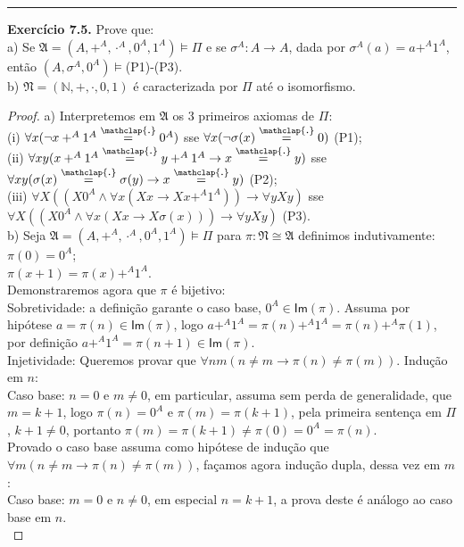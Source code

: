 \documentclass[11pt]{article}
\newcommand{\mf}[1]{\mathfrak{#1}}
\newcommand{\msf}[1]{\mathsf{#1}}
\newcommand{\mbb}[1]{\mathbb{#1}}
\newcommand\overtext[2]{\stackrel{\mathclap{\normalfont\mbox{#1}}}{#2}}
\begin{document}
\hrule

\begin{shaded}
\textbf{Exercício 7.5.} Prove que:\\
a) Se $\mf{A}=(A,+^A,\cdot^A,0^A,1^A)\vDash\Pi$ e se $\sigma^A:A\to A$, dada por $\sigma^A(a)=a+^A1^A$, então $(A,\sigma^A,0^A)\vDash$(P1)-(P3).\\
b) $\mf{N}=(\mbb{N},+,\cdot,0,1)$ é caracterizada por $\Pi$ até o isomorfismo.
\end{shaded}

\begin{proof}
    a) Interpretemos em $\mf{A}$ os 3 primeiros axiomas de $\Pi$:\\
    (i) $\forall x(\neg x+^A1^A\overtext{.}{=}0^A)$ sse $\forall x(\neg\sigma(x)\overtext{.}{=}0)$ (P1);\\
    (ii) $\forall xy(x+^A1^A\overtext{.}{=}y+^A1^A\rightarrow x\overtext{.}{=}y)$ sse $\forall xy(\sigma(x)\overtext{.}{=}\sigma(y)\rightarrow x\overtext{.}{=}y)$ (P2);\\
    (iii) $\forall X((X0^A\wedge\forall x(Xx\rightarrow Xx+^A1^A))\rightarrow\forall yXy)$ sse $\forall X((X0^A\wedge\forall x(Xx\rightarrow X\sigma(x)))\rightarrow\forall yXy)$ (P3).\\
    b) Seja $\mf{A}=(A,+^A,\cdot^A,0^A,1^A)\vDash\Pi$ para $\pi:\mf{N}\cong\mf{A}$ definimos indutivamente:\\
    $\pi(0)=0^A$;\\
    $\pi(x+1)=\pi(x)+^A1^A$.\\
    Demonstraremos agora que $\pi$ é bijetivo:\\
    Sobretividade: a definição garante o caso base, $0^A\in\msf{Im}(\pi)$. Assuma por hipótese $a=\pi(n)\in\msf{Im}(\pi)$, logo $a+^A1^A=\pi(n)+^A1^A=\pi(n)+^A\pi(1)$, por definição $a+^A1^A=\pi(n+1)\in\msf{Im}(\pi)$.\\
    Injetividade: Queremos provar que $\forall nm(n\ne m\rightarrow\pi(n)\ne\pi(m))$. Indução em $n$:\\
    Caso base: $n=0$ e $m\ne0$, em particular, assuma sem perda de generalidade, que $m=k+1$, logo $\pi(n)=0^A$ e $\pi(m)=\pi(k+1)$, pela primeira sentença em $\Pi$, $k+1\ne0$, portanto $\pi(m)=\pi(k+1)\ne\pi(0)=0^A=\pi(n)$.\\
    Provado o caso base assuma como hipótese de indução que $\forall m(n\ne m\rightarrow\pi(n)\ne\pi(m))$, façamos agora indução dupla, dessa vez em $m$:\\
    Caso base: $m=0$ e $n\ne0$, em especial $n=k+1$, a prova deste é análogo ao caso base em $n$.\\

\end{proof}
\end{document}
